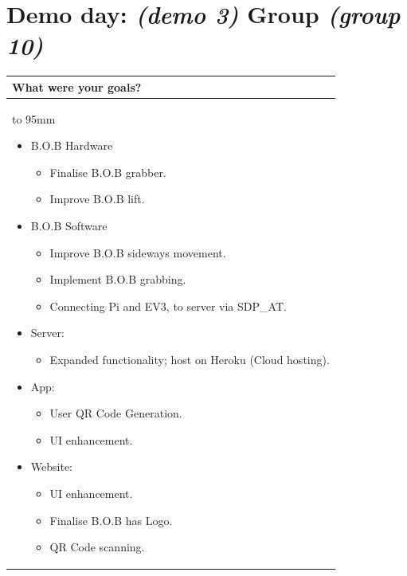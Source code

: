 \documentclass[a4paper]{article}
\newcommand{\colWidth}{141mm}
\begin{document}
 
\section*{Demo day: \textit{(demo 3)} Group \textit{(group 10)}}


\begin{center}
\begin{tabular}{|p{\colWidth}|}
	\hline
	\cellcolor{blue!25}\large
	\textbf{What were your goals?}
	\\ \hline
	\vtop to 95mm{
\begin{itemize}
    \item B.O.B Hardware
    \begin{itemize}
         \item Finalise B.O.B grabber. 
         \item Improve B.O.B lift. 
    \end{itemize}
    \item B.O.B Software
    \begin{itemize} 
        \item Improve B.O.B sideways movement.
        \item Implement B.O.B grabbing.
        \item Connecting Pi and EV3, to server via SDP\_AT.
    \end{itemize}
    \item Server: 
    \begin{itemize}
        \item Expanded functionality; host on Heroku (Cloud hosting).
    \end{itemize}
    \item App:
    \begin{itemize}
        \item User QR Code Generation.
        \item UI enhancement.
    \end{itemize}
    \item Website: 
    \begin{itemize}
        \item UI enhancement.
        \item Finalise B.O.B has Logo.
        \item QR Code scanning.
    \end{itemize}
\end{itemize}
  }
  \\
  \hline
\end{tabular}
\vskip 5mm


\end{center}
\end{document}

